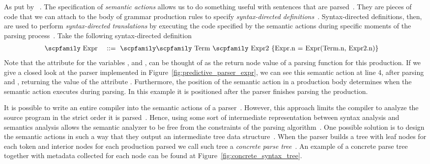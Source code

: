 \documentclass[
  oneside,
  english,
  coorientadorbanca,
  noabntexcite
]{ufsc-thesis-rn46-2019}
\def\bnfdef{::=}
\newcommand{\codett}[1]{\text{\scpfamily#1}}
\newcommand{\code}[1]{\text{\scpfamily\setlength\spaceskip{0.35em}#1}}
\newcommand{\bnfvar}[1]{\codett{#1}}
\newcommand{\bnfprod}[2]{\bnfvar{#1} & \ & \bnfdef{} & \ \code{#2}}
\begin{document}
As put by~\textcite{appel2003modern} .
The specification of \textit{semantic actions} allows us to do something useful with sentences that are parsed~\cite{appel2003modern}.
They are pieces of code that we can attach to the body of grammar production rules to specify \textit{syntax-directed definitions}~\cite{Aho:2006:CPT:1177220}.
Syntax-directed definitions, then, are used to perform \textit{syntax-directed translations} by executing the code specified by the semantic actions during specific moments of the parsing process~\cite{Aho:2006:CPT:1177220}.
Take the following syntax-directed definition
\begin{alignat}{2}
  \bnfprod{Expr}{\bnfvar{Term} \bnfvar{Expr2} \{Expr.n = Expr(Term.n, Expr2.n)\}} \label{eq:sdd_example}
\end{alignat}
Note that the attribute \codett{n} for the variables \bnfvar{Expr}, \bnfvar{Term} and \bnfvar{Expr2}, can be thought of as the return node value of a parsing function for this production.
If we give a closed look at the parser implemented in Figure~\ref{fig:predictive_parser_expr}, we can see this semantic action at line 4, after parsing \bnfvar{Term} and \bnfvar{Expr2}, returning the value of the attribute \codett{Expr.n}.
Furthermore, the position of the semantic action in a production body determines when the semantic action executes during parsing.
In this example it is positioned after the parser finishes parsing the production.

It is possible to write an entire compiler into the semantic actions of a parser~\cite{appel2003modern}.
However, this approach limits the compiler to analyze the source program in the strict order it is parsed~\cite{appel2003modern}.
Hence, using some sort of intermediate representation between syntax analysis and semantics analysis allows the semantic analyzer to be free from the constraints of the parsing algorithm~\cite{appel2003modern}.
One possible solution is to design the semantic actions in such a way that they output an intermediate tree data structure~\cite{appel2003modern}.
When the parser builds a tree with leaf nodes for each token and interior nodes for each production parsed we call such tree a \textit{concrete parse tree}~\cite{appel2003modern}.
An example of a concrete parse tree together with metadata collected for each node can be found at Figure~\ref{fig:concrete_syntax_tree}.
\end{document}
